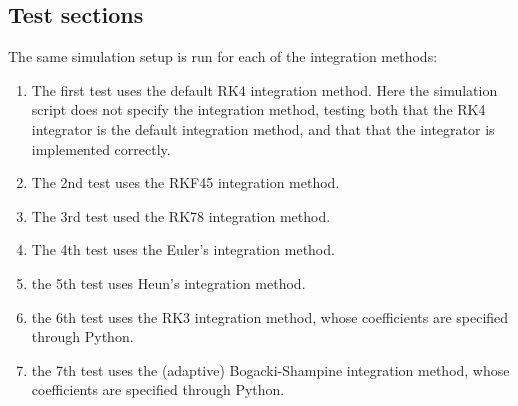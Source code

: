 \subsection{Test sections}
The same simulation setup is run for each of the integration methods:
\begin{enumerate}
\item The first test uses the default RK4 integration method.  Here the simulation script does not specify the integration method, testing both that the RK4 integrator is the default integration method, and that that the integrator is implemented correctly.

\item The 2nd test uses the RKF45 integration method.

\item The 3rd test used the RK78 integration method.

\item The 4th test uses the Euler's integration method.

\item the 5th test uses Heun's integration method.

\item the 6th test uses the RK3 integration method, whose coefficients are specified through Python.

\item the 7th test uses the (adaptive) Bogacki-Shampine integration method, whose coefficients are specified through Python.

\end{enumerate}

